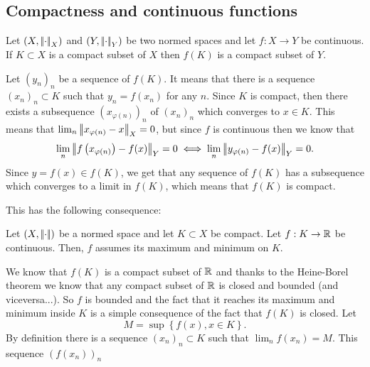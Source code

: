 \documentclass{article}
\begin{document}
\subsection{Compactness and continuous functions}
\begin{proposition}
	Let $(X,\left|\negthinspace\left|\cdot\right|\negthinspace\right|_X)$ and $(Y,\left|\negthinspace\left|\cdot\right|\negthinspace\right|_Y)$ be two normed spaces and let $f:X\to Y$ be continuous. If $K\subset X$ is a compact subset of $X$ then $f(K)$ is a compact subset of $Y$.
\end{proposition}
\begin{fancyproof}
	Let ${(y_{n})}_{n}$ be a sequence of $f(K)$. It means that there is a sequence ${(x_{n})}_{n}\subset K$ such that $y_{n}=f(x_n)$ for any $n$. Since $K$ is compact, then there exists a subsequence ${\left(x_{\varphi(n)}\right)}_{n}$ of ${(x_{n})}_{n}$ which converges to $x\in K$. This means that $\lim_n\left|\negthinspace\left|x_{\varphi(n)}-x\right|\negthinspace\right|_{X}=0$, but since $f$ is continuous then we know that 
	\begin{equation*}
		\lim_n\left|\negthinspace\left|f\left(x_{\varphi(n)}\right)-f(x)\right|\negthinspace\right|_{Y}=0\iff	\lim_n\left|\negthinspace\left|y_{\varphi(n)}-f(x)\right|\negthinspace\right|_{Y}=0.
	\end{equation*}
	Since $y=f(x)\in f(K)$, we get that any sequence of $f(K)$ has a subsequence which converges to a limit in $f(K)$, which means that $f(K)$ is compact.
\end{fancyproof}
This has the following consequence:
\begin{theorem}
	Let $\left(X,\left|\negthinspace\left|\cdot\right|\negthinspace\right|\right)$ be a normed space and let $K\subset X$ be compact. Let $f:K\to\mathbb{R}$ be continuous. Then, $f$ assumes its maximum and minimum on $K$.
\end{theorem}
\begin{fancyproof}
	We know that $f(K)$ is a compact subset of $\mathbb{R}$ and thanks to the Heine-Borel theorem we know that any compact subset of $\mathbb{R}$ is closed and bounded (and viceversa...). So $f$ is bounded and the fact that it reaches its maximum and minimum inside $K$ is a simple consequence of the fact that $f(K)$ is closed. Let
	\begin{equation*}
		M=\sup\left\{f(x),x\in K\right\}.
	\end{equation*}
	By definition there is a sequence ${(x_{n})}_{n}\subset K$ such that $\lim_{n}f(x_{n})=M$. This sequence ${(f(x_{n}))}_{n}$
\end{fancyproof}
\end{document}
